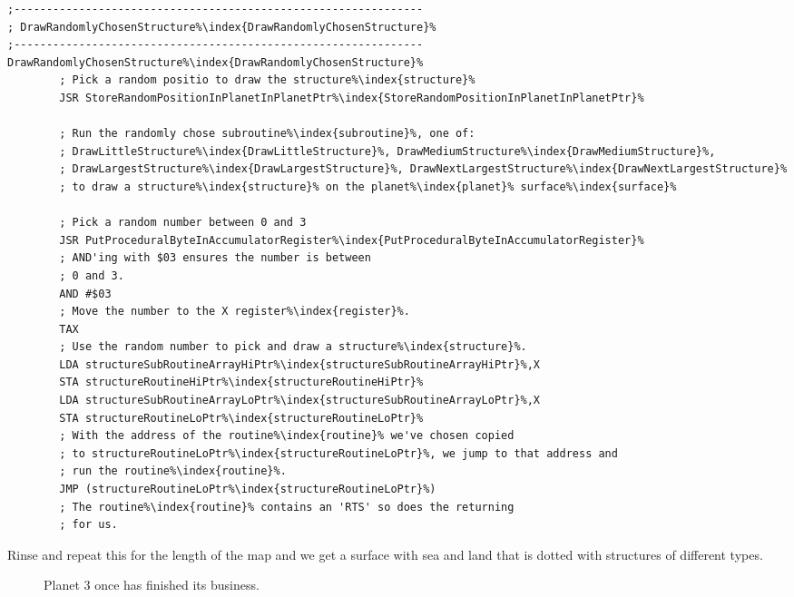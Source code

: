 \begin{lstlisting}[caption=\icode{DrawRandomlyChosenStructure\index{DrawRandomlyChosenStructure}} picks a random position and a random draw routine\index{routine} to use at that position.,escapechar=\%]
;---------------------------------------------------------------
; DrawRandomlyChosenStructure%\index{DrawRandomlyChosenStructure}%
;---------------------------------------------------------------
DrawRandomlyChosenStructure%\index{DrawRandomlyChosenStructure}%
        ; Pick a random positio to draw the structure%\index{structure}%
        JSR StoreRandomPositionInPlanetInPlanetPtr%\index{StoreRandomPositionInPlanetInPlanetPtr}%

        ; Run the randomly chose subroutine%\index{subroutine}%, one of:
        ; DrawLittleStructure%\index{DrawLittleStructure}%, DrawMediumStructure%\index{DrawMediumStructure}%,
        ; DrawLargestStructure%\index{DrawLargestStructure}%, DrawNextLargestStructure%\index{DrawNextLargestStructure}%
        ; to draw a structure%\index{structure}% on the planet%\index{planet}% surface%\index{surface}%

        ; Pick a random number between 0 and 3
        JSR PutProceduralByteInAccumulatorRegister%\index{PutProceduralByteInAccumulatorRegister}%
        ; AND'ing with $03 ensures the number is between
        ; 0 and 3.
        AND #$03
        ; Move the number to the X register%\index{register}%.
        TAX
        ; Use the random number to pick and draw a structure%\index{structure}%.
        LDA structureSubRoutineArrayHiPtr%\index{structureSubRoutineArrayHiPtr}%,X
        STA structureRoutineHiPtr%\index{structureRoutineHiPtr}%
        LDA structureSubRoutineArrayLoPtr%\index{structureSubRoutineArrayLoPtr}%,X
        STA structureRoutineLoPtr%\index{structureRoutineLoPtr}%
        ; With the address of the routine%\index{routine}% we've chosen copied
        ; to structureRoutineLoPtr%\index{structureRoutineLoPtr}%, we jump to that address and
        ; run the routine%\index{routine}%.
        JMP (structureRoutineLoPtr%\index{structureRoutineLoPtr}%)
        ; The routine%\index{routine}% contains an 'RTS' so does the returning
        ; for us.
\end{lstlisting}

Rinse and repeat this for the length of the map and we get a surface with sea and land that is dotted with structures
of different types.

\begin{figure}[H]
  {
    \begin{adjustbox}{width=10cm,center}
    \end{adjustbox}
  }\caption[]{Planet 3 once  has finished its business.}
\end{figure}

